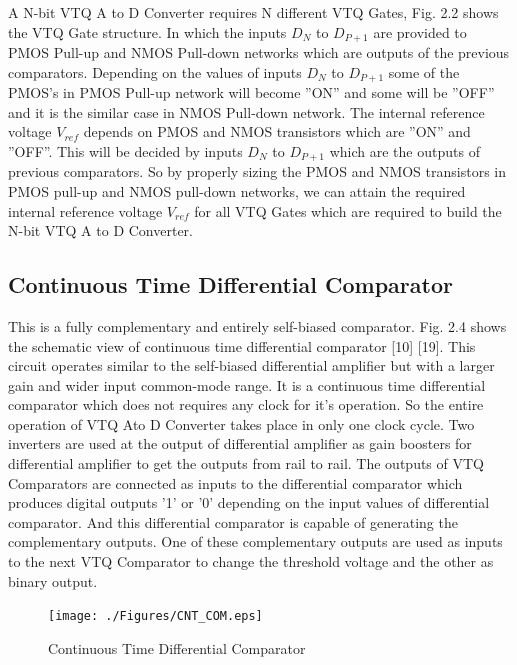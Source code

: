 \par
\hspace{1.2cm}A N-bit VTQ A to D Converter requires N different VTQ Gates, Fig. 2.2 shows the VTQ Gate structure. In which the inputs $D_N$ to $D_{P+1}$ are provided to PMOS Pull-up and NMOS Pull-down networks which are outputs of the previous comparators. Depending on the values of inputs $D_N$ to $D_{P+1}$ some of the PMOS’s in PMOS Pull-up network will become ”ON” and some will be ”OFF” and it is the similar case in NMOS Pull-down network. The internal reference voltage $V_{ref}$ depends on PMOS and NMOS transistors which are ”ON” and ”OFF”. This will be decided by inputs $D_N$ to $D_{P+1}$ which are the outputs of previous comparators. So by properly sizing the PMOS and NMOS transistors in PMOS pull-up and NMOS pull-down networks, we can attain the required internal reference voltage $V_{ref}$ for all VTQ Gates which are required to build the N-bit VTQ A to D Converter.


\subsection{Continuous Time Differential Comparator}

\par
\hspace{1.2cm}This is a fully complementary and entirely self-biased comparator. Fig. 2.4 shows the schematic view of continuous time differential comparator [10] [19]. This circuit operates similar to the self-biased differential amplifier but with a larger gain and wider input common-mode range. It is a continuous time differential comparator which does not requires any clock for it’s operation. So the entire operation of VTQ Ato D Converter takes place in only one clock cycle. Two inverters are used at the output of differential amplifier as gain boosters for differential amplifier to get the outputs from rail to rail. The outputs of VTQ Comparators are connected as inputs to the differential comparator which produces digital outputs ’1’ or ’0’ depending on the input values of differential comparator. And this differential comparator is capable of generating the complementary outputs. One of these complementary outputs are used as inputs to the next VTQ Comparator to change the threshold voltage and the other as binary output. 

\begin{figure}[ht]
\begin{center}
\texttt{[image: ./Figures/CNT\_COM.eps]}
\caption{Continuous Time Differential Comparator }
\label{fig:CNT_COM}
\end{center}
\end{figure}

